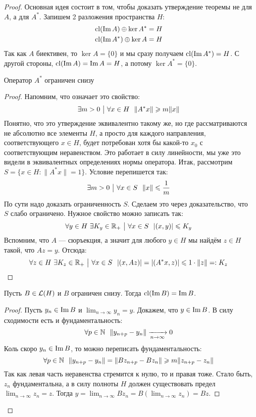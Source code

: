\begin{proof}
	Основная идея состоит в том, чтобы доказать утверждение теоремы не для $A$, а для $A^*$. Запишем 2 разложения пространства $H$:
	\begin{align*}
		&{\operatorname{cl}(\operatorname{Im} A) \oplus \ker A^* = H}
		\\
		&{\operatorname{cl}(\operatorname{Im} A^*) \oplus \ker A = H}
	\end{align*}
	Так как $A$ биективен, то $\ker A = \{0\}$ и мы сразу получаем $\operatorname{cl}(\operatorname{Im} A^*) = H$. С другой стороны, $\operatorname{cl}(\operatorname{Im} A) = \operatorname{Im} A = H$, а потому $\ker A^* = \{0\}$.
	\begin{lemma} \label{conj_op_bot_bounded_lemma}
		Оператор $A^*$ ограничен снизу
	\end{lemma}
	
	\begin{proof}
		Напомним, что означает это свойство:
		\[
			\exists m > 0 \such \forall x \in H\ \ \|A^*x\| \ge m\|x\|
		\]
		Понятно, что это утверждение эквивалентно такому же, но где рассматриваются не абсолютно все элементы $H$, а просто для каждого направления, соответствующего $x \in H$, будет потребован хотя бы какой-то $x_0$ с соответствующим неравенством. Это работает в силу линейности, мы уже это видели в эквивалентных определениях нормы оператора. Итак, рассмотрим $S = \{x \in H \colon \|A^*x\| = 1\}$. Условие перепишется так:
		\[
			\exists m > 0 \ \big|\  \forall x \in S\ \ \|x\| \leqslant \frac{1}{m}
		\]
		По сути надо доказать ограниченность $S$. Сделаем это через доказательство, что $S$ слабо ограничено. Нужное свойство можно записать так:
		\[
			\forall y \in H\ \exists K_y \in \mathbb{R}_+ \ \big|\  \forall x \in S\ \ |(x, y)| \leqslant K_y
		\]
		Вспомним, что $A$ --- сюръекция, а значит для любого $y \in H$ мы найдём $z \in H$ такой, что $Az = y$. Отсюда:
		\[
			\forall z \in H\ \exists K_z \in \mathbb{R}_+ \ \big|\  \forall x \in S\ \ |(x, Az)| = |(A^*x, z)| \leqslant 1 \cdot \|z\| =: K_z
		\]
	\end{proof}
	
	
	\begin{lemma}
		Пусть $B \in \mathcal{L}(H)$ и $B$ ограничен снизу. Тогда $\operatorname{cl}(\operatorname{Im} B) = \operatorname{Im} B$.
	\end{lemma}
	
	\begin{proof}
		Пусть $y_n \in \operatorname{Im} B$ и $\lim_{n \to \infty} y_n = y$. Докажем, что $y \in \operatorname{Im} B$. В силу сходимости есть и фундаментальность:
		\[
			\forall p \in \mathbb{N}\ \ \|y_{n + p} - y_n\| \xrightarrow[n \to \infty]{} 0
		\]
		Коль скоро $y_n \in \operatorname{Im} B$, то можно переписать фундаментальность:
		\[
			\forall p \in \N\ \ \|y_{n + p} - y_n\| = \|Bz_{n + p} - Bz_n\| \ge m\|z_{n + p} - z_n\|
		\]
		Так как левая часть неравенства стремится к нулю, то и правая тоже. Стало быть, $z_n$ фундаментальна, а в силу полноты $H$ должен существовать предел $\lim_{n \to \infty} z_n = z$. Тогда $y = \lim_{n \to \infty} Bz_n = B( \lim_{n \to \infty} z_n) = Bz$.
	\end{proof}
	

\end{proof}
